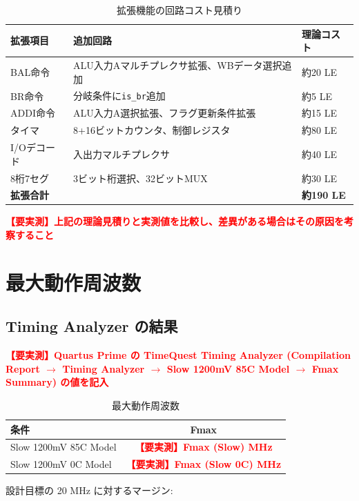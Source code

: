 \documentclass[a4paper,11pt]{ltjsarticle}
\newcommand{\measured}[1]{\textcolor{red}{\textbf{【要実測】#1}}}
\begin{document}
\begin{table}[h]
\centering
\caption{拡張機能の回路コスト見積り}
\begin{tabular}{lp{5cm}p{5cm}}
\toprule
拡張項目 & 追加回路 & 理論コスト \\
\midrule
BAL命令 & ALU入力Aマルチプレクサ拡張、WBデータ選択追加 & 約20 LE \\
BR命令 & 分岐条件に\texttt{is\_br}追加 & 約5 LE \\
ADDI命令 & ALU入力A選択拡張、フラグ更新条件拡張 & 約15 LE \\
タイマ & 8+16ビットカウンタ、制御レジスタ & 約80 LE \\
I/Oデコード & 入出力マルチプレクサ & 約40 LE \\
8桁7セグ & 3ビット桁選択、32ビットMUX & 約30 LE \\
\midrule
\textbf{拡張合計} & & \textbf{約190 LE} \\
\bottomrule
\end{tabular}
\end{table}

\measured{上記の理論見積りと実測値を比較し、差異がある場合はその原因を考察すること}


\section{最大動作周波数}

\subsection{Timing Analyzer の結果}

\measured{Quartus Prime の TimeQuest Timing Analyzer (Compilation Report $\to$ Timing Analyzer $\to$ Slow 1200mV 85C Model $\to$ Fmax Summary) の値を記入}

\begin{table}[h]
\centering
\caption{最大動作周波数}
\begin{tabular}{lc}
\toprule
条件 & Fmax \\
\midrule
Slow 1200mV 85C Model & \measured{Fmax (Slow) MHz} \\
Slow 1200mV 0C Model  & \measured{Fmax (Slow 0C) MHz} \\
\bottomrule
\end{tabular}
\end{table}

設計目標の 20 MHz に対するマージン:
\end{document}
